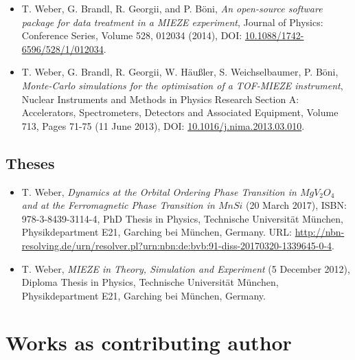 \begin{itemize}
	\item T. Weber, G. Brandl, R. Georgii, and P. B\"oni,
	\textit{An open-source software package for data treatment in a MIEZE experiment},
	Journal of Physics: Conference Series, Volume 528, 012034 (2014),
	DOI: \href{https://doi.org/10.1088/1742-6596/528/1/012034}{10.1088/1742-6596/528/1/012034}.
	
	\item T. Weber, G. Brandl, R. Georgii, W. H\"au\ss{}ler, S. Weichselbaumer, P. B\"oni,
	\textit{Monte-Carlo simulations for the optimisation of a TOF-MIEZE instrument},
	Nuclear Instruments and Methods in Physics Research Section A: Accelerators, Spectrometers, Detectors and Associated Equipment, Volume 713, Pages 71-75 (11 June 2013),
	DOI: \href{https://doi.org/10.1016/j.nima.2013.03.010}{10.1016/j.nima.2013.03.010}.
\end{itemize}


\subsection*{Theses}
\begin{itemize}
	\item T. Weber, \textit{Dynamics at the Orbital Ordering Phase Transition in $MgV_2O_4$ and at the Ferromagnetic Phase Transition in $MnSi$} (20 March 2017), ISBN: 978-3-8439-3114-4,
	PhD Thesis in Physics, Technische Universit\"at M\"unchen, Physikdepartment E21,
	Garching bei M\"unchen, Germany. URL: \url{http://nbn-resolving.de/urn/resolver.pl?urn:nbn:de:bvb:91-diss-20170320-1339645-0-4}.

	\item T. Weber, \textit{MIEZE in Theory, Simulation and Experiment} (5 December 2012), 
	Diploma Thesis in Physics, Technische Universit\"at M\"unchen, Physikdepartment E21,
	Garching bei M\"unchen, Germany.
\end{itemize}



\section{Works as contributing author}

